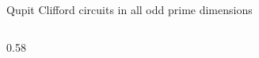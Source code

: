 \begin{frame}{Qupit Clifford circuits in all odd prime dimensions \New}
\begin{columns}[c]
\begin{column}{0.58\textwidth}
\begin{code}
\AgdaSpace{}%
\AgdaOperator{\AgdaDatatype{===}}\AgdaSpace{}%
\<%
\\
%
\>[2]\AgdaSpace{}%
\AgdaSymbol{:}\AgdaSpace{}%
\AgdaSpace{}%
\AgdaSpace{}%
\AgdaSpace{}%
\AgdaSymbol{(}\AgdaSpace{}%
\AgdaSymbol{)}\AgdaSpace{}%
%
\>[32]\AgdaSpace{}%
\AgdaSpace{}%
\AgdaOperator{\AgdaDatatype{===}}\AgdaSpace{}%
\AgdaSpace{}%
\AgdaSymbol{(}\AgdaSpace{}%
\AgdaSymbol{)}\<%
\\
%
\>[2]\AgdaSpace{}%
\AgdaSymbol{:}%
\>[18]\AgdaSymbol{(}\AgdaSpace{}%
\AgdaSymbol{)}\AgdaSpace{}%
%
\>[32]\AgdaSpace{}%
\AgdaSpace{}%
\AgdaSpace{}%
\AgdaSymbol{(}\AgdaSpace{}%
\AgdaOperator{\AgdaPostulate{*}}\AgdaSpace{}%
\AgdaSymbol{)}\AgdaSpace{}%
\AgdaSpace{}%
\AgdaSpace{}%
\AgdaSymbol{((}\AgdaSpace{}%
\AgdaOperator{\AgdaPostulate{*}}\AgdaSpace{}%
\AgdaSpace{}%
\AgdaOperator{\AgdaPostulate{+}}\AgdaSpace{}%
\AgdaOperator{\AgdaPostulate{-}}\AgdaSpace{}%
\AgdaSymbol{)}\AgdaSpace{}%
\AgdaOperator{\AgdaPostulate{*}}\AgdaSpace{}%
\AgdaSymbol{)}\<%
\\
%
\>[32]\AgdaOperator{\AgdaDatatype{===}}\AgdaSpace{}%
\AgdaSpace{}%
\AgdaSpace{}%
\<%
\\
%
\>[2]\AgdaSpace{}%
\AgdaSymbol{:}%
\>[18]\AgdaSymbol{(}\AgdaSpace{}%
\AgdaSymbol{)}\AgdaSpace{}%
%
\>[32]\AgdaSpace{}%
\AgdaSpace{}%
\AgdaSpace{}%
\AgdaSpace{}%
\AgdaSpace{}%
\AgdaSpace{}%
\AgdaSpace{}%
\AgdaSpace{}%
\AgdaSpace{}%

\end{code}
\end{column}
\end{columns}
\end{frame}
